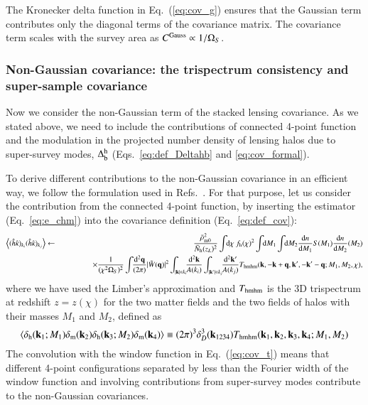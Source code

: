 \documentclass[onecolumn,notitlepage,showpacs,amsmath,amssymb,prd,floatfix]{revtex4-1}
\def\ave#1{\left\langle #1 \right\rangle}
\newcommand{\bk}{{\bf k}}
\newcommand{\bq}{{\bf q}}
\newcommand{\tW}{\tilde{W}}
\newcommand{\dr}{\mathrm{d}}
\newcommand{\deltam}{\delta_{\mathrm{m}}}
\newcommand{\bNh}{\bar{N}_{\rm h}}
\newcommand{\br}{{\rm b}}
\begin{document}
The Kronecker delta function in Eq.~(\ref{eq:cov_g}) ensures that the
Gaussian term contributes only the diagonal terms of the covariance
matrix. The covariance term scales with the survey area as $C^{\rm
Gauss}\propto 1/\Omega_S$.


\subsubsection{Non-Gaussian covariance: the trispectrum consistency and
   super-sample covariance}

Now we consider the non-Gaussian term of the stacked lensing
covariance. As we stated above, we need to include the contributions of
connected 4-point function and the modulation in the projected number
density of lensing halos due to super-survey modes, $\Delta_\br^{\rm h}$
(Eqs.~\ref{eq:def_Deltahb} and \ref{eq:cov_formal}).

To derive different contributions to the non-Gaussian covariance in an
efficient way, we follow the formulation used in
Refs.~\cite{TakadaHu:13,Lietal:14a}. For that purpose, let us consider
the contribution from the connected 4-point function, by inserting the
estimator (Eq.~\ref{eq:e_chm}) into the covariance definition
(Eq.~\ref{eq:def_cov}):
%
\begin{eqnarray}
 \ave{(\hat{h}\hat{\kappa})_{k_i}(\hat{h}\hat{\kappa})_{k_j}}&\leftarrow&
  \frac{\bar{\rho}_{\rm m0}^2}{\bNh(z_L)^2}\int\!\!\dr\chi~f_{\rm h}(\chi)^2
  \int\!\!\dr M_1\int\!\!\dr M_2\frac{\dr n}{\dr M_1}S(M_1)\frac{\dr
  n}{\dr M_2}(M_2)\nonumber\\
 &&\hspace{4em}\times
  \frac{1}{(\chi^2\Omega_S)^2}\int\!\!\frac{\dr^2\bq}{(2\pi)}|\tW(\bq)|^2
  \int_{|\bk|\in k_i}\!\!\frac{\dr^2\bk}{A(k_i)}
  \int_{|\bk'|\in k_j}\!\!\frac{\dr^2\bk'}{A(k_j)}
  T_{\rm hmhm}(\bk,-\bk+\bq,\bk',-\bk'-\bq;M_1,M_2,\chi),
  \label{eq:cov_t}
\end{eqnarray}
%
where we have used the Limber's approximation and $T_{\rm hmhm}$ is the
3D trispectrum at redshift $z=z(\chi)$ for the two matter fields and the
two fields of halos with their masses $M_1$ and $M_2$, defined as
%
\begin{equation}
\ave{\delta_{\rm h}(\bk_1;M_1)\deltam(\bk_2)\delta_{\rm
 h}(\bk_3;M_2)\deltam(\bk_4)}
 \equiv (2\pi)^3\delta_D^3(\bk_{1234})T_{\rm
 hmhm}(\bk_1,\bk_2,\bk_3,\bk_4; M_1,M_2)
\end{equation}
%
The convolution with the window function in Eq.~(\ref{eq:cov_t}) means
that different 4-point configurations separated by less than the Fourier
width of the window function and involving contributions from
super-survey modes contribute to the non-Gaussian covariances. 
\end{document}
